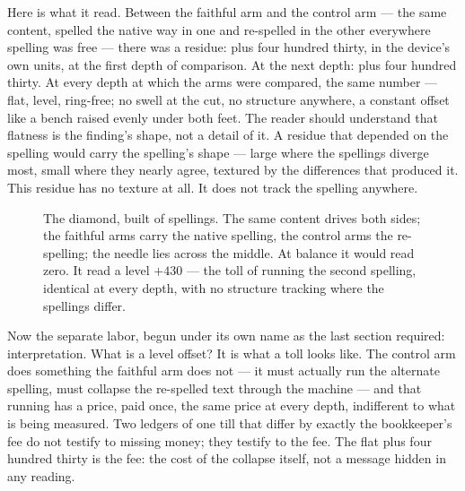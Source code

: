 Here is what it read. Between the faithful arm and the control arm --- the same
content, spelled the native way in one and re-spelled in the other everywhere
spelling was free --- there was a residue: plus four hundred thirty, in the device's
own units, at the first depth of comparison. At the next depth: plus four hundred
thirty. At every depth at which the arms were compared, the same number --- flat,
level, ring-free; no swell at the cut, no structure anywhere, a constant offset like
a bench raised evenly under both feet. The reader should understand that flatness is
the finding's shape, not a detail of it. A residue that depended on the spelling
would carry the spelling's shape --- large where the spellings diverge most, small
where they nearly agree, textured by the differences that produced it. This residue
has no texture at all. It does not track the spelling anywhere.

\begin{figure}[htbp]
\centering
{}
\caption{The diamond, built of spellings. The same content drives both sides; the
faithful arms carry the native spelling, the control arms the re-spelling; the
needle lies across the middle. At balance it would read zero. It read a level
$+430$ --- the toll of running the second spelling, identical at every depth, with
no structure tracking where the spellings differ.}
\end{figure}

Now the separate labor, begun under its own name as the last section required:
interpretation. What is a level offset? It is what a toll looks like. The control
arm does something the faithful arm does not --- it must actually run the alternate
spelling, must collapse the re-spelled text through the machine --- and that
running has a price, paid once, the same price at every depth, indifferent to what
is being measured. Two ledgers of one till that differ by exactly the bookkeeper's
fee do not testify to missing money; they testify to the fee. The flat plus four
hundred thirty is the fee: the cost of the collapse itself, not a message hidden
in any reading.

